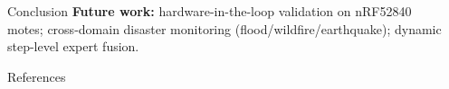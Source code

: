 \documentclass[final]{beamer}
\newlength{\sepwidth}
\newlength{\colwidth}
\newcommand{\separatorcolumn}{\begin{column}{\sepwidth}\end{column}}
\begin{document}
\begin{frame}[t]
\begin{columns}[t]
\begin{column}{\colwidth}
\begin{block}{Conclusion}
    \smallskip
    \textbf{Future work:} hardware-in-the-loop validation on nRF52840 motes; cross-domain disaster monitoring (flood/wildfire/earthquake); dynamic step-level expert fusion.
  \end{block}

  \begin{block}{References}
    \vspace{0}
    \nocite{*}
    \footnotesize{}
  \end{block}

\end{column}

\separatorcolumn
\end{columns}
\end{frame}
\end{document}
